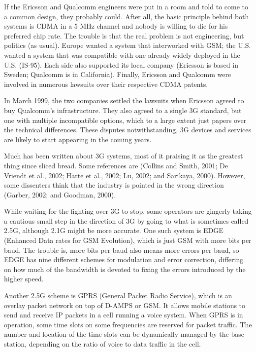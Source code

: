 \documentclass[b5paper,11pt]{memoir}
\begin{document}
If the Ericsson and Qualcomm engineers were put in a room and told to
come to a common design, they probably could. After all, the basic
principle behind both systems is CDMA in a 5 MHz channel and nobody is
willing to die for his preferred chip rate. The trouble is that the real
problem is not engineering, but politics (as usual). Europe wanted a
system that interworked with GSM; the U.S. wanted a system that was
compatible with one already widely deployed in the U.S. (IS-95). Each
side also supported its local company (Ericsson is based in Sweden;
Qualcomm is in California). Finally, Ericsson and Qualcomm were involved
in numerous lawsuits over their respective CDMA patents.

In March 1999, the two companies settled the lawsuits when Ericsson
agreed to buy Qualcomm's infrastructure. They also agreed to a single 3G
standard, but one with multiple incompatible options, which to a large
extent just papers over the technical differences. These disputes
notwithstanding, 3G devices and services are likely to start appearing
in the coming years.

Much has been written about 3G systems, most of it praising it as the
greatest thing since sliced bread. Some references are (Collins and
Smith, 2001; De Vriendt et al., 2002; Harte et al., 2002; Lu, 2002; and
Sarikaya, 2000). However, some dissenters think that the industry is
pointed in the wrong direction (Garber, 2002; and Goodman, 2000).

While waiting for the fighting over 3G to stop, some operators are
gingerly taking a cautious small step in the direction of 3G by going to
what is sometimes called {2.5G}, although 2.1G might be more accurate.
One such system is {EDGE} ({Enhanced Data rates for GSM Evolution}),
which is just GSM with more bits per baud. The trouble is, more bits per
baud also means more errors per baud, so EDGE has nine different schemes
for modulation and error correction, differing on how much of the
bandwidth is devoted to fixing the errors introduced by the higher
speed.

Another 2.5G scheme is {GPRS} ({General Packet Radio Service}), which is
an overlay packet network on top of D-AMPS or GSM. It allows mobile
stations to send and receive IP packets in a cell running a voice
system. When GPRS is in operation, some time slots on some frequencies
are reserved for packet traffic. The number and location of the time
slots can be dynamically managed by the base station, depending on the
ratio of voice to data traffic in the cell.
\end{document}
